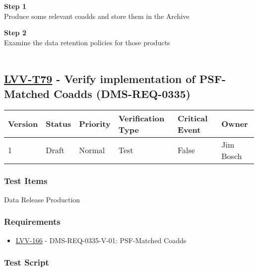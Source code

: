 \textbf{Step 1}\\

\hypertarget{description-val}{}
Produce some relevant coadds and store them in the Archive

\textbf{Step 2}\\
Examine the data retention policies for those products\\
~\\

\hypertarget{lvv-t79---verify-implementation-of-psf-matched-coadds-dms-req-0335}{%
\subsection{\texorpdfstring{\href{https://jira.lsstcorp.org/secure/Tests.jspa\#/testCase/LVV-T79}{LVV-T79}
- Verify implementation of PSF-Matched Coadds
(DMS-REQ-0335)}{LVV-T79 - Verify implementation of PSF-Matched Coadds (DMS-REQ-0335)}}\label{lvv-t79---verify-implementation-of-psf-matched-coadds-dms-req-0335}}

\begin{longtable}[]{@{}llllll@{}}
\toprule
Version & Status & Priority & Verification Type & Critical Event &
Owner\tabularnewline
\midrule
\endhead
1 & Draft & Normal & Test & False & Jim Bosch\tabularnewline
\bottomrule
\end{longtable}

\hypertarget{test-items-55}{%
\subsubsection{Test Items}\label{test-items-55}}

Data Release Production

\hypertarget{requirements-56}{%
\subsubsection{Requirements}\label{requirements-56}}

\begin{itemize}
\tightlist
\item
  \href{https://jira.lsstcorp.org/browse/LVV-166}{LVV-166} -
  DMS-REQ-0335-V-01: PSF-Matched Coadds
\end{itemize}

\hypertarget{test-script-56}{%
\subsubsection{Test Script}\label{test-script-56}}


